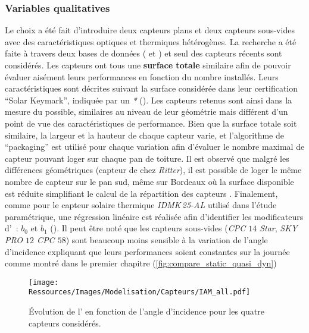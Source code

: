 \subsubsection{Variables qualitatives} %
\label{ssub:variables_qualitatives}
Le choix a été fait d’introduire deux capteurs plans et deux capteurs sous-vides avec
des caractéristiques optiques et thermiques hétérogènes. La recherche a été faite
à travers deux bases de données ( et
) et seul des capteurs récents sont considérés.
Les capteurs ont tous une \textbf{surface totale} similaire afin de pouvoir évaluer
aisément leurs performances en fonction du nombre installés. Leurs caractéristiques
sont décrites suivant la surface considérée dans leur certification \enquote{Solar Keymark},
indiquée par un \emph{*} (). Les capteurs
retenus sont ainsi dans la mesure du possible, similaires au niveau de leur  géométrie
mais différent d’un point de vue des caractéristiques de performance. Bien que
la surface totale soit similaire, la largeur et la hauteur de chaque capteur varie, et
l’algorithme de \enquote{packaging} est utilisé pour chaque variation afin d’évaluer le
nombre maximal de capteur pouvant loger sur chaque pan de toiture. Il est observé que
malgré les différences géométriques (capteur de chez \textit{Ritter}), il est possible de
loger le même nombre de capteur sur le pan sud, même sur Bordeaux où la surface disponible
est réduite simplifiant le calcul de la répartition des capteurs .
Finalement, comme pour le capteur solaire thermique \textit{IDMK\,25-AL} utilisé dans
l’étude paramétrique, une régression linéaire est réalisée afin d’identifier les
modificateurs d’~: $b_{0}$ et $b_{1}$ (). Il peut
être noté que les capteurs sous-vides (\textit{CPC $14$ Star}, \textit{SKY PRO $12$ CPC
$58$}) sont beaucoup moins sensible à la variation de l’angle d’incidence expliquant que
leurs performances soient constantes sur la journée comme montré dans le premier chapitre
(\ref{fig:compare_static_quasi_dyn})

\begin{figure}
    \centering
    \texttt{[image: Ressources/Images/Modelisation/Capteurs/IAM\_all.pdf]}
    \caption[Évolution de l’ en fonction de l’angle d’incidence]
    {Évolution de l’ en fonction de l’angle d’incidence pour les quatre capteurs considérés.}
    \label{fig:correlation_IAM_all}
\end{figure}

